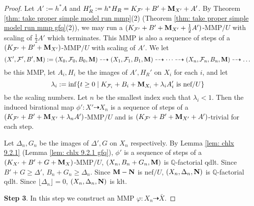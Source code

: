 \documentclass[11pt]{amsart}
\numberwithin{equation}{section}
\newcommand{\Mm}{{\bf{M}}}
\newcommand{\Nn}{{\bf{N}}}
\newcommand{\Qq}{\mathbb{Q}}
\newcommand{\Ff}{\mathcal{F}}
\theoremstyle{definition}
\theoremstyle{definition}
\theoremstyle{definition}
\begin{document}
\begin{proof}
Let $A':=h^*A$ and $H_R':=h^*H_R=K_{\Ff'}+B'+\Mm_{X'}+A'$. By Theorem \ref{thm: take proper simple model run mmp}(2) (Theorem \ref{thm: take proper simple model run mmp gfq}(2)), we may run a $(K_{\Ff'}+B'+\Mm_{X'}+\frac{1}{2}A')$-MMP$/U$ with scaling of $\frac{1}{2}A'$ which terminates. This MMP is also a sequence of steps of a $(K_{\Ff'}+B'+\Mm_{X'})$-MMP$/U$ with scaling of $A'$. We let
$$(X',\Ff',B',\Mm):=(X_0,\Ff_0,B_0,\Mm)\dashrightarrow (X_1,\Ff_1,B_1,\Mm)\dashrightarrow\dots\dashrightarrow (X_n,\Ff_n,B_n,\Mm)\dashrightarrow\dots$$
be this MMP, let $A_i,H_i$ be the images of $A',H_R'$ on $X_i$ for each $i$, and let
$$\lambda_i:=\inf\{t\geq 0\mid K_{\Ff_i}+B_i+\Mm_{X_i}+\lambda_iA_i'\text{ is nef}/U\}$$
be the scaling numbers. Let $n$ be the smallest index such that $\lambda_i<1$. Then the induced birational map $\phi': X'\dashrightarrow X_n$ is a sequence of steps of a $(K_{\Ff'}+B'+\Mm_{X'}+\lambda_n A')$-MMP$/U$ and is $(K_{\Ff'}+B'+\Mm_{X'}+A')$-trivial for each step.

Let $\Delta_n,G_n$ be the images of $\Delta',G$ on $X_n$ respectively. By Lemma \ref{lem: chlx 9.2.1} (Lemma \ref{lem: chlx 9.2.1 gfq}), $\phi'$ is a sequence of steps of a $(K_{X'}+B'+G+\Mm_X)$-MMP$/U$, $(X_n,B_n+G_n,\Mm)$ is $\Qq$-factorial qdlt. Since $B'+G\geq\Delta'$, $B_n+G_n\geq\Delta_n$. Since $\Mm-\Nn$ is nef$/U$, $(X_n,\Delta_n,\Nn)$ is $\Qq$-factorial qdlt. Since $\lfloor\Delta_n\rfloor=0$, $(X_n,\Delta_n,\Nn)$ is klt. 

\medskip

\noindent\textbf{Step 3}. In this step we construct an MMP $\varphi: X_n\dashrightarrow \bar X$.


\end{proof}
\end{document}
